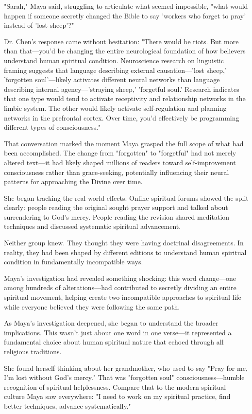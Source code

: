 \documentclass[12pt,twoside]{book}
\begin{document}
"Sarah," Maya said, struggling to articulate what seemed impossible, "what would happen if someone secretly changed the Bible to say 'workers who forget to pray' instead of 'lost sheep'?"

Dr. Chen's response came without hesitation: "There would be riots. But more than that—you'd be changing the entire neurological foundation of how believers understand human spiritual condition. Neuroscience research on linguistic framing suggests that language describing external causation—'lost sheep,' 'forgotten soul'—likely activates different neural networks than language describing internal agency—'straying sheep,' 'forgetful soul.' Research indicates that one type would tend to activate receptivity and relationship networks in the limbic system. The other would likely activate self-regulation and planning networks in the prefrontal cortex. Over time, you'd effectively be programming different types of consciousness."

That conversation marked the moment Maya grasped the full scope of what had been accomplished. The change from "forgotten" to "forgetful" had not merely altered text—it had likely shaped millions of readers toward self-improvement consciousness rather than grace-seeking, potentially influencing their neural patterns for approaching the Divine over time.

She began tracking the real-world effects. Online spiritual forums showed the split clearly: people reading the original sought prayer support and talked about surrendering to God's mercy. People reading the revision shared meditation techniques and discussed systematic spiritual advancement.

Neither group knew. They thought they were having doctrinal disagreements. In reality, they had been shaped by different editions to understand human spiritual condition in fundamentally incompatible ways.

Maya's investigation had revealed something shocking: this word change—one among hundreds of alterations—had contributed to secretly dividing an entire spiritual movement, helping create two incompatible approaches to spiritual life while everyone believed they were following the same path.

As Maya's investigation deepened, she began to understand the broader implications. This wasn't just about one word in one verse—it represented a fundamental choice about human spiritual nature that echoed through all religious traditions.

She found herself thinking about her grandmother, who used to say "Pray for me, I'm lost without God's mercy." That was "forgotten soul" consciousness—humble recognition of spiritual helplessness. Compare that to the modern spiritual culture Maya saw everywhere: "I need to work on my spiritual practice, find better techniques, advance systematically."
\end{document}
